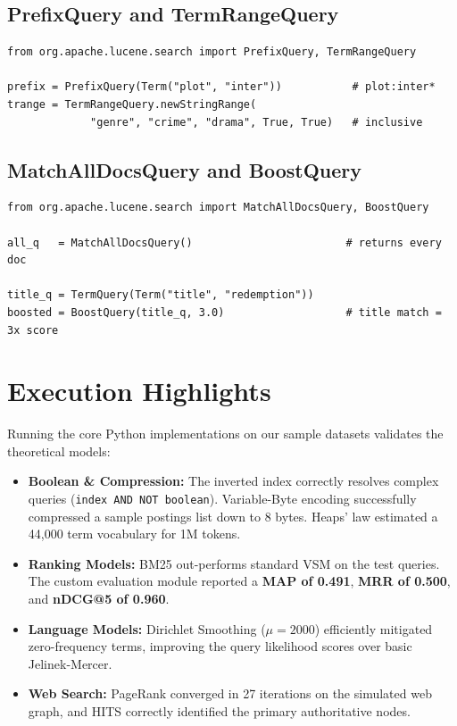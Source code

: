 \documentclass[11pt,a4paper]{article}
\begin{document}
\subsection{PrefixQuery and TermRangeQuery}

\begin{lstlisting}[caption={PrefixQuery and TermRangeQuery}]
from org.apache.lucene.search import PrefixQuery, TermRangeQuery

prefix = PrefixQuery(Term("plot", "inter"))           # plot:inter*
trange = TermRangeQuery.newStringRange(
             "genre", "crime", "drama", True, True)   # inclusive
\end{lstlisting}

\subsection{MatchAllDocsQuery and BoostQuery}

\begin{lstlisting}[caption={MatchAllDocsQuery and BoostQuery}]
from org.apache.lucene.search import MatchAllDocsQuery, BoostQuery

all_q   = MatchAllDocsQuery()                        # returns every doc

title_q = TermQuery(Term("title", "redemption"))
boosted = BoostQuery(title_q, 3.0)                   # title match = 3x score
\end{lstlisting}

\section{Execution Highlights}

Running the core Python implementations on our sample datasets validates the theoretical models:
\begin{itemize}[leftmargin=*, nosep]
  \item \textbf{Boolean \& Compression:} The inverted index correctly resolves complex queries (\texttt{index AND NOT boolean}). Variable-Byte encoding successfully compressed a sample postings list down to 8 bytes. Heaps' law estimated a 44,000 term vocabulary for 1M tokens.
  \item \textbf{Ranking Models:} BM25 out-performs standard VSM on the test queries. The custom evaluation module reported a \textbf{MAP of 0.491}, \textbf{MRR of 0.500}, and \textbf{nDCG@5 of 0.960}.
  \item \textbf{Language Models:} Dirichlet Smoothing ($\mu=2000$) efficiently mitigated zero-frequency terms, improving the query likelihood scores over basic Jelinek-Mercer.
  \item \textbf{Web Search:} PageRank converged in 27 iterations on the simulated web graph, and HITS correctly identified the primary authoritative nodes.
\end{itemize}
\end{document}
